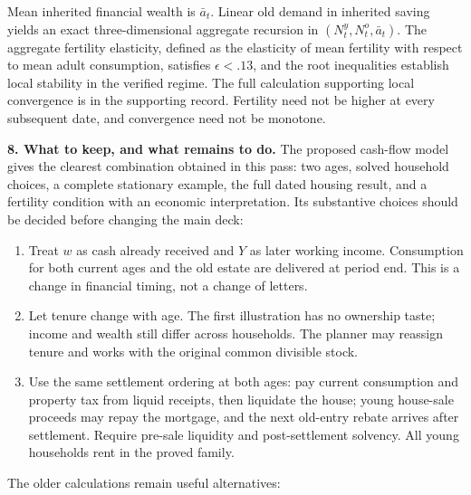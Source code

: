 \documentclass[11pt]{article}
\begin{document}
Mean inherited financial wealth is $\bar a_t$. Linear old demand in inherited
saving yields an exact three-dimensional aggregate recursion in
$(N_t^y,N_t^o,\bar a_t)$. The aggregate fertility elasticity, defined as the
elasticity of mean fertility with respect to mean adult consumption, satisfies
$\epsilon<.13$, and the root inequalities establish local stability in the
verified regime. The full calculation supporting local convergence is in the
supporting record. Fertility need not be higher at every subsequent date, and
convergence need not be monotone.

\newpage
\textbf{8. What to keep, and what remains to do.}
The proposed cash-flow model gives the clearest combination obtained in this
pass: two ages, solved household choices, a complete stationary example,
the full dated housing result, and a fertility condition with an economic
interpretation. Its substantive choices should be decided before changing
the main deck:

\begin{enumerate}
\item Treat $w$ as cash already received and $Y$ as later working income.
Consumption for both current ages and the old estate are delivered at period
end. This is a change in financial timing, not a change of letters.
\item Let tenure change with age. The first illustration has no ownership
taste; income and wealth still differ across households. The planner may
reassign tenure and works with the original common divisible stock.
\item Use the same settlement ordering at both ages: pay current consumption
and property tax from liquid receipts, then liquidate the house; young
house-sale proceeds may repay the mortgage, and the next old-entry rebate
arrives after settlement. Require pre-sale liquidity and post-settlement
solvency. All young households rent in the proved family.
\end{enumerate}

The older calculations remain useful alternatives:
\end{document}
